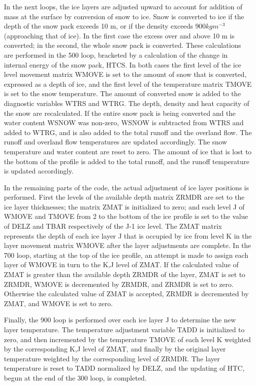In the next loops, the ice layers are adjusted upward to account for addition of mass at the surface by conversion of snow to ice. Snow is converted to ice if the depth of the snow pack exceeds 10 m, or if the density exceeds $900 kg m^{-3}$ (approaching that of ice). In the first case the excess over and above 10 m is converted; in the second, the whole snow pack is converted. These calculations are performed in the 500 loop, bracketed by a calculation of the change in internal energy of the snow pack, H\+T\+C\+S. In both cases the first level of the ice level movement matrix W\+M\+O\+V\+E is set to the amount of snow that is converted, expressed as a depth of ice, and the first level of the temperature matrix T\+M\+O\+V\+E is set to the snow temperature. The amount of converted snow is added to the diagnostic variables W\+T\+R\+S and W\+T\+R\+G. The depth, density and heat capacity of the snow are recalculated. If the entire snow pack is being converted and the water content W\+S\+N\+O\+W was non-\/zero, W\+S\+N\+O\+W is subtracted from W\+T\+R\+S and added to W\+T\+R\+G, and is also added to the total runoff and the overland flow. The runoff and overland flow temperatures are updated accordingly. The snow temperature and water content are reset to zero. The amount of ice that is lost to the bottom of the profile is added to the total runoff, and the runoff temperature is updated accordingly.

In the remaining parts of the code, the actual adjustment of ice layer positions is performed. First the levels of the available depth matrix Z\+R\+M\+D\+R are set to the ice layer thicknesses; the matrix Z\+M\+A\+T is initialized to zero; and each level J of W\+M\+O\+V\+E and T\+M\+O\+V\+E from 2 to the bottom of the ice profile is set to the value of D\+E\+L\+Z and T\+B\+A\+R respectively of the J-\/1 ice level. The Z\+M\+A\+T matrix represents the depth of each ice layer J that is occupied by ice from level K in the layer movement matrix W\+M\+O\+V\+E after the layer adjustments are complete. In the 700 loop, starting at the top of the ice profile, an attempt is made to assign each layer of W\+M\+O\+V\+E in turn to the K,J level of Z\+M\+A\+T. If the calculated value of Z\+M\+A\+T is greater than the available depth Z\+R\+M\+D\+R of the layer, Z\+M\+A\+T is set to Z\+R\+M\+D\+R, W\+M\+O\+V\+E is decremented by Z\+R\+M\+D\+R, and Z\+R\+M\+D\+R is set to zero. Otherwise the calculated value of Z\+M\+A\+T is accepted, Z\+R\+M\+D\+R is decremented by Z\+M\+A\+T, and W\+M\+O\+V\+E is set to zero.

Finally, the 900 loop is performed over each ice layer J to determine the new layer temperature. The temperature adjustment variable T\+A\+D\+D is initialized to zero, and then incremented by the temperature T\+M\+O\+V\+E of each level K weighted by the corresponding K,J level of Z\+M\+A\+T, and finally by the original layer temperature weighted by the corresponding level of Z\+R\+M\+D\+R. The layer temperature is reset to T\+A\+D\+D normalized by D\+E\+L\+Z, and the updating of H\+T\+C, begun at the end of the 300 loop, is completed.